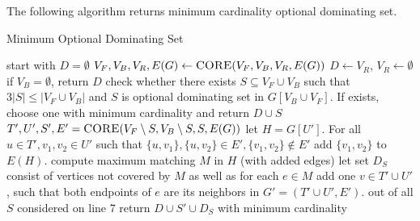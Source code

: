 The following algorithm returns minimum cardinality optional dominating set. 
\begin{algorithm}
\caption{Minimum Optional Dominating Set}
\label{alg:mods}
\begin{algorithmic}[1]
 
\State start with $D = \emptyset$
\State $V_F, V_B, V_R, E(G) \gets \textsc{CORE}(V_F, V_B, V_R, E(G))$
\State $D \gets V_R$, $V_R \gets \emptyset$
\State if $V_B = \emptyset$, return $D$
\State check whether there exists $S \subseteq V_F \cup V_B$ such that $3|S| \leq |V_F \cup V_B|$ and $S$ is optional dominating set in $G[V_B \cup V_F]$. If exists, choose one with minimum cardinality and return $D \cup S$
\State $T', U', S', E' = \textsc{CORE}(V_F \setminus S, V_B\setminus S, S, E(G))$
\State let $H = G[U']$. For all $u\in T', v_1, v_2 \in U'$ such that $\{u, v_1\}, \{u, v_2\} \in E', \{v_1, v_2\} \notin E'$ add $\{v_1, v_2\}$ to $E(H)$.
\State compute maximum matching $M$ in $H$ (with added edges)
\State let set $D_S$ consist of vertices not covered by $M$ as well as for each $e \in M$ add one $v \in T' \cup U'$, such that both endpoints of $e$ are its neighbors in $G' = (T' \cup U', E')$.   
\EndFor 
\State out of all $S$ considered on line 7 return $D \cup S' \cup D_S$ with minimum cardinality
\EndProcedure
\end{algorithmic}
\end{algorithm}

